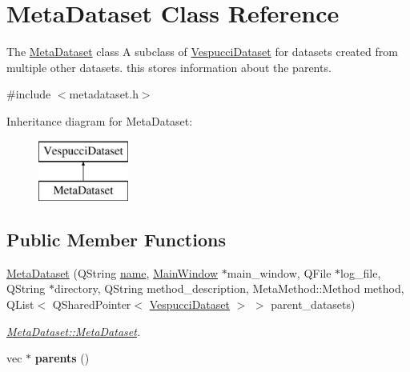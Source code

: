 \hypertarget{class_meta_dataset}{}\section{Meta\+Dataset Class Reference}
\label{class_meta_dataset}


The \hyperlink{class_meta_dataset}{Meta\+Dataset} class A subclass of \hyperlink{class_vespucci_dataset}{Vespucci\+Dataset} for datasets created from multiple other datasets. this stores information about the parents.  




{\ttfamily \#include $<$metadataset.\+h$>$}

Inheritance diagram for Meta\+Dataset\+:\begin{figure}[H]
\begin{center}
\leavevmode
\includegraphics[height=2.000000cm]{class_meta_dataset}
\end{center}
\end{figure}
\subsection*{Public Member Functions}
\begin{DoxyCompactItemize}
\item 
\hyperlink{class_meta_dataset_a18bdddde9c879805c1f6be74b30728d3}{Meta\+Dataset} (Q\+String \hyperlink{class_vespucci_dataset_a345a51b60127316b41caf92dc88fd792}{name}, \hyperlink{class_main_window}{Main\+Window} $\ast$main\+\_\+window, Q\+File $\ast$log\+\_\+file, Q\+String $\ast$directory, Q\+String method\+\_\+description, Meta\+Method\+::\+Method method, Q\+List$<$ Q\+Shared\+Pointer$<$ \hyperlink{class_vespucci_dataset}{Vespucci\+Dataset} $>$ $>$ parent\+\_\+datasets)
\begin{DoxyCompactList}\small\item\em \hyperlink{class_meta_dataset_a18bdddde9c879805c1f6be74b30728d3}{Meta\+Dataset\+::\+Meta\+Dataset}. \end{DoxyCompactList}\item 
vec $\ast$ {\bfseries parents} ()\hypertarget{class_meta_dataset_a0cca41844d506f070c4b8b8f6e101b18}{}\label{class_meta_dataset_a0cca41844d506f070c4b8b8f6e101b18}

\end{DoxyCompactItemize}
